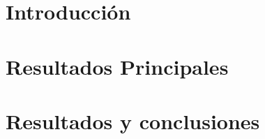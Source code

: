 \documentclass[a4paper, 12pt]{report}
\begin{document}
\tableofcontents %

\clearpage
\listoffigures %

\chapter{Introducción}\label{cap.introduccion}
\chapter{Resultados Principales}
\chapter*{Resultados y conclusiones}





\end{document}
